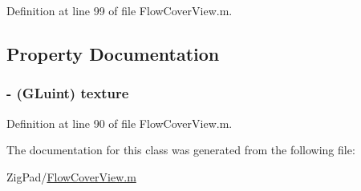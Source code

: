 Definition at line 99 of file FlowCoverView.m.



\subsection{Property Documentation}
\hypertarget{interface_flow_cover_record_a0704dfe56dec926cb35f7bdc0834ecd0}{
\subsubsection[{texture}]{\setlength{\rightskip}{0pt plus 5cm}-\/ (GLuint) texture}}
\label{interface_flow_cover_record_a0704dfe56dec926cb35f7bdc0834ecd0}


Definition at line 90 of file FlowCoverView.m.



The documentation for this class was generated from the following file:\begin{DoxyCompactItemize}
\item 
ZigPad/\hyperlink{_flow_cover_view_8m}{FlowCoverView.m}\end{DoxyCompactItemize}
